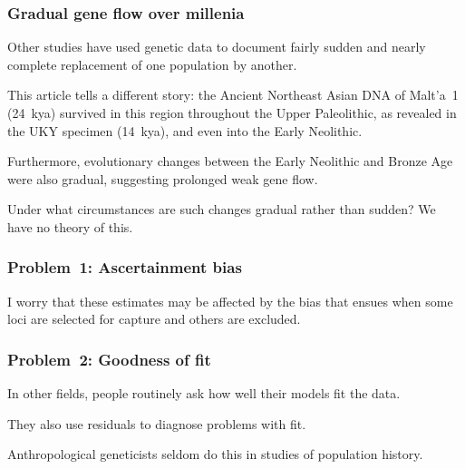 \documentclass[pdftex,12pt,dvipsnames]{beamer}
\begin{document}
\begin{frame}
  \frametitle{Gradual gene flow over millenia}

  Other studies have used genetic data to document fairly sudden
  and nearly complete replacement of one population by another.

  \bigskip

  This article tells a different story: the Ancient Northeast Asian
  DNA of Malt'a~1 (24~kya) survived in this region throughout the
  Upper Paleolithic, as revealed in the UKY specimen (14~kya), and
  even into the Early Neolithic.

  \bigskip

  Furthermore, evolutionary changes between the Early Neolithic and
  Bronze Age were also gradual, suggesting prolonged weak gene flow.

  \bigskip

  Under what circumstances are such changes gradual rather than
  sudden? We have no theory of this.
\end{frame}

\begin{frame}
  \frametitle{Problem~1: Ascertainment bias}

  I worry that these estimates may be affected by the bias that ensues
  when some loci are selected for capture and others are excluded.

\end{frame}  

\begin{frame}
  \frametitle{Problem~2: Goodness of fit}

  In other fields, people routinely ask how well their models fit the
  data.

  \bigskip

  They also use residuals to diagnose problems with fit.

  \bigskip

  Anthropological geneticists seldom do this in studies of population
  history.
\end{frame}
\end{document}
